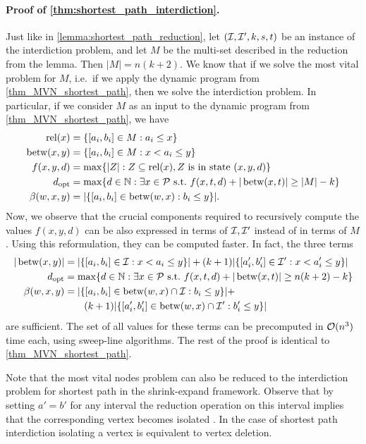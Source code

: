 \paragraph*{Proof of \cref{thm:shortest_path_interdiction}.}
Just like in \cref{lemma:shortest_path_reduction}, let $(\mathcal{I}, \mathcal{I}', k, s,t)$ be an instance of the interdiction problem, and let $M$ be the multi-set described in the reduction from the lemma. Then $|M| = n(k+2)$. We know that if we solve the most vital  problem for $M$, i.e.\ if we apply the dynamic program from \cref{thm_MVN_shortest_path}, then we solve the interdiction problem. In particular, if we consider $M$ as an input to the dynamic program from \cref{thm_MVN_shortest_path}, we have 
\begin{align*}
\operatorname{\text{rel}}(x) &= \{ [a_i, b_i] \in M : a_i \leq x \}\\
\operatorname{\text{betw}}(x, y) &= \{ [a_i, b_i] \in M : x < a_i \leq y \}\\
f(x,y,d) &= \max\{ |Z| : Z \subseteq \operatorname{\text{rel}}(x), Z \text{ is in state } (x,y,d) \}\\
d_{\text{opt}} &=  \max\{ d \in \mathbb{N} : \exists x \in \mathcal{P} \text{ s.t.\ } f(x,t,d) + |\operatorname{\text{betw}}(x, t)| \geq |M| - k \}\\
\beta(w,x,y) &= |\{ [a_i, b_i] \in \operatorname{\text{betw}}(w,x) : b_i \leq y \}|.
\end{align*}
Now, we observe that the crucial components required to recursively compute the values $f(x,y,d)$ can be also expressed in terms of $\mathcal{I}, \mathcal{I}'$ instead of in terms of $M$. Using this reformulation, they can be computed faster. In fact, the three terms
\begin{align*}
|\operatorname{\text{betw}}(x, y)| &= |\{ [a_i, b_i] \in \mathcal{I} : x < a_i \leq y \}| + (k+1)|\{ [a'_i, b'_i] \in \mathcal{I}' : x < a'_i \leq y \}|\\
d_{\text{opt}} &=  \max\{ d \in \mathbb{N} : \exists x \in \mathcal{P} \text{ s.t.\ } f(x,t,d) + |\operatorname{\text{betw}}(x, t)| \geq n(k+2) - k \}\\
\beta(w,x,y) &= |\{ [a_i, b_i] \in \operatorname{\text{betw}}(w,x)\cap \mathcal{I} : b_i \leq y \}| + \\
&\qquad (k+1)|\{ [a'_i, b'_i] \in \operatorname{\text{betw}}(w,x)\cap \mathcal{I}' : b'_i \leq y \}|
\end{align*}
are sufficient. The set of all values for these terms can be precomputed in $\mathcal{O}(n^3)$ time each, using sweep-line algorithms. The rest of the proof is identical to \cref{thm_MVN_shortest_path}.


Note that the most vital nodes problem can also be reduced to the interdiction  problem  for  shortest  path in the shrink-expand framework.
Observe that by setting $a'=b'$ for any interval the reduction operation 
on this interval implies that the corresponding vertex becomes isolated . 
In the case of shortest path interdiction isolating a vertex is equivalent to vertex deletion.

